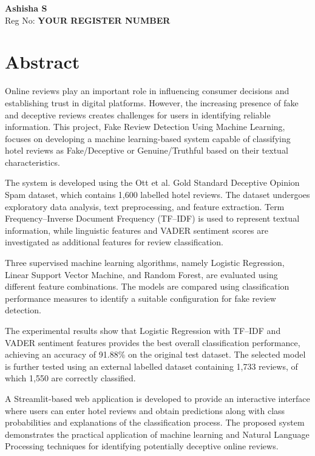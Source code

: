 \documentclass[12pt,a4paper]{report}
\begin{document}
\begin{flushright}
\textbf{Ashisha S}\\
Reg No: \textbf{YOUR REGISTER NUMBER}
\end{flushright}


\newpage

\chapter*{Abstract}
{}

Online reviews play an important role in influencing
consumer decisions and establishing trust in digital
platforms. However, the increasing presence of fake
and deceptive reviews creates challenges for users
in identifying reliable information. This project,
Fake Review Detection Using Machine Learning,
focuses on developing a machine learning-based
system capable of classifying hotel reviews as
Fake/Deceptive or Genuine/Truthful based on
their textual characteristics.

The system is developed using the Ott et al.
Gold Standard Deceptive Opinion Spam dataset,
which contains 1,600 labelled hotel reviews.
The dataset undergoes exploratory data analysis,
text preprocessing, and feature extraction.
Term Frequency--Inverse Document Frequency
(TF--IDF) is used to represent textual information,
while linguistic features and VADER sentiment
scores are investigated as additional features
for review classification.

Three supervised machine learning algorithms,
namely Logistic Regression, Linear Support Vector
Machine, and Random Forest, are evaluated using
different feature combinations. The models are
compared using classification performance measures
to identify a suitable configuration for fake
review detection.

The experimental results show that Logistic
Regression with TF--IDF and VADER sentiment
features provides the best overall classification
performance, achieving an accuracy of 91.88\%
on the original test dataset. The selected model
is further tested using an external labelled
dataset containing 1,733 reviews, of which
1,550 are correctly classified.

A Streamlit-based web application is developed
to provide an interactive interface where users
can enter hotel reviews and obtain predictions
along with class probabilities and explanations
of the classification process. The proposed
system demonstrates the practical application
of machine learning and Natural Language
Processing techniques for identifying
potentially deceptive online reviews.
\end{document}
